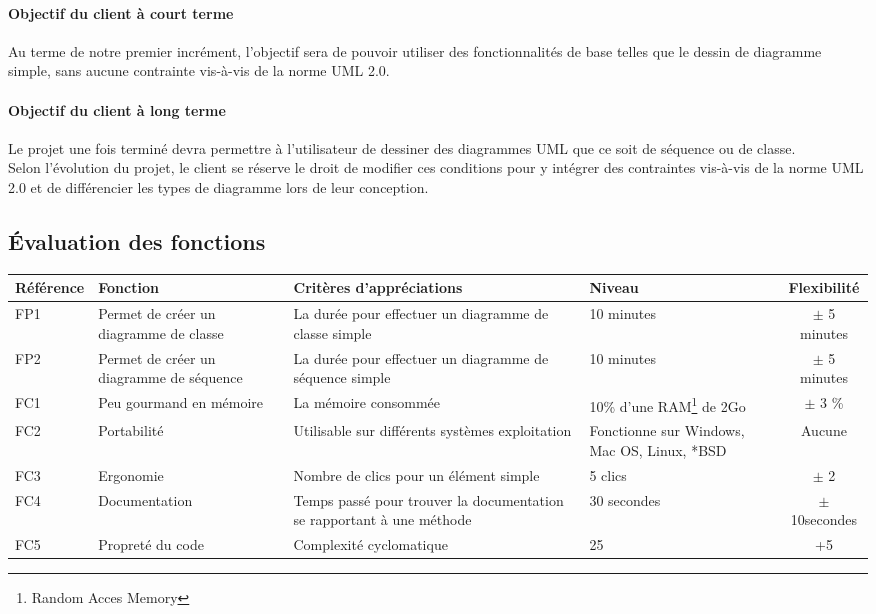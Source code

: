 \documentclass[12pt,a4paper,openany]{article}
\begin{document}
	\paragraph{Objectif du client à court terme} Au terme de notre premier incrément, l'objectif sera
	de pouvoir utiliser des fonctionnalités de base telles que le dessin de diagramme simple, sans aucune
	contrainte vis-à-vis de la norme UML 2.0.
	\paragraph{Objectif du client à long terme}
	Le projet une fois terminé devra permettre à l'utilisateur de dessiner des diagrammes UML que ce soit de séquence ou de classe.\\
	Selon l'évolution du projet, le client se réserve le droit de modifier ces conditions pour y
	intégrer des contraintes vis-à-vis de la norme UML 2.0 et de différencier les types de diagramme lors de leur conception. 
	
	\subsection{Évaluation des fonctions}
	\begin{tabular}{|p{2cm}|p{3cm}|p{5cm}|p{3cm}|c|}
		\hline
		\textbf{Référence}& \textbf{Fonction} & \textbf{Critères d'appréciations} & \textbf{Niveau} & \textbf{Flexibilité} \\
		\hline
			FP1 & Permet de créer un diagramme de classe & La durée pour effectuer un diagramme de classe simple & 10 minutes & $\pm$ 5 minutes\\
		\hline
			FP2 & Permet de créer un diagramme de séquence & La durée pour effectuer un diagramme de séquence simple & 10 minutes & $\pm$ 5 minutes\\
		\hline
			FC1 & Peu gourmand en mémoire & La mémoire consommée & 10\% d'une RAM\footnote{Random Acces Memory} de 2Go & $\pm$ 3 \%\\
		\hline
			FC2 & Portabilité & Utilisable sur différents systèmes exploitation & Fonctionne sur Windows, Mac OS, Linux, *BSD & Aucune \\
		\hline
			FC3 & Ergonomie & Nombre de clics pour un élément simple & 5 clics & $\pm$ 2\\
		\hline
			FC4 & Documentation & Temps passé pour trouver la documentation se rapportant à une méthode &30 secondes& $\pm$10secondes \\ 
		\hline
			FC5 & Propreté du code & Complexité cyclomatique& 25 & +5\\ 
		\hline
	\end{tabular}
\end{document}
